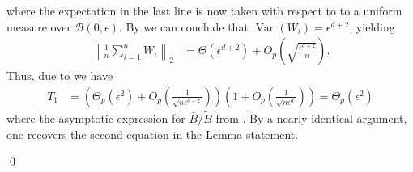 \documentclass[11pt]{article}
\begin{document}
where the expectation in the last line is now taken with respect to to a uniform measure over $\mathcal{B}(0, \epsilon)$. By  we can conclude that $\operatorname{Var}(W_i) = \epsilon^{d+2}$, yielding
\begin{align*}
    \left\|\frac{1}{n}\sum_{i = 1}^nW_i\right\|_2 &=  \Theta(\epsilon^{d+2}) + O_p\left(\sqrt{\frac{\epsilon^{d + 2}}{n}}\right).
\end{align*}
Thus, due to  we have
\begin{align*}
    T_1 &= \left(\Theta_p\left(\epsilon^2\right) + O_p\left(\frac{1}{\sqrt{n\epsilon^{d-2}}}\right)\right) \left(1 + O_p\left(\frac{1}{\sqrt{n\epsilon^d}}\right)\right) = \Theta_p\left(\epsilon^2\right) \tag{provided $n\epsilon^d \rightarrow \infty$}
\end{align*}
where the asymptotic expression for $\bar{B}/\tilde{B}$ from . By a nearly identical argument, one recovers the second equation in the Lemma statement.

\qed{}
\end{document}
